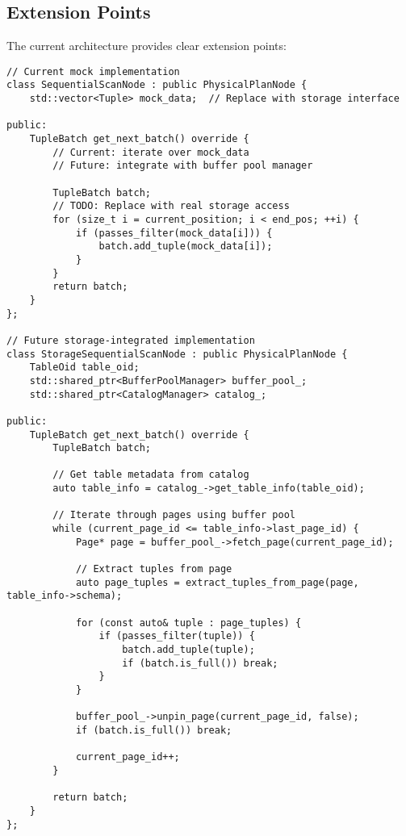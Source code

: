\documentclass[12pt,a4paper]{article}
\begin{document}
    \subsection{Extension Points}

    The current architecture provides clear extension points:

    \begin{lstlisting}[style=cpp, caption=Storage Interface Extension Point]
// Current mock implementation
class SequentialScanNode : public PhysicalPlanNode {
    std::vector<Tuple> mock_data;  // Replace with storage interface
    
public:
    TupleBatch get_next_batch() override {
        // Current: iterate over mock_data
        // Future: integrate with buffer pool manager
        
        TupleBatch batch;
        // TODO: Replace with real storage access
        for (size_t i = current_position; i < end_pos; ++i) {
            if (passes_filter(mock_data[i])) {
                batch.add_tuple(mock_data[i]);
            }
        }
        return batch;
    }
};

// Future storage-integrated implementation
class StorageSequentialScanNode : public PhysicalPlanNode {
    TableOid table_oid;
    std::shared_ptr<BufferPoolManager> buffer_pool_;
    std::shared_ptr<CatalogManager> catalog_;
    
public:
    TupleBatch get_next_batch() override {
        TupleBatch batch;
        
        // Get table metadata from catalog
        auto table_info = catalog_->get_table_info(table_oid);
        
        // Iterate through pages using buffer pool
        while (current_page_id <= table_info->last_page_id) {
            Page* page = buffer_pool_->fetch_page(current_page_id);
            
            // Extract tuples from page
            auto page_tuples = extract_tuples_from_page(page, table_info->schema);
            
            for (const auto& tuple : page_tuples) {
                if (passes_filter(tuple)) {
                    batch.add_tuple(tuple);
                    if (batch.is_full()) break;
                }
            }
            
            buffer_pool_->unpin_page(current_page_id, false);
            if (batch.is_full()) break;
            
            current_page_id++;
        }
        
        return batch;
    }
};
    \end{lstlisting}
\end{document}
